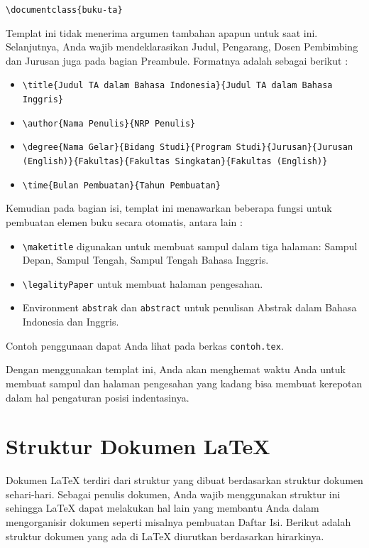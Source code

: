 \documentclass{ta-scientics-matematika-its}
\begin{document}
        \texttt{\textbackslash{}documentclass\{buku-ta\}}

        Templat ini tidak menerima argumen tambahan apapun untuk saat ini. Selanjutnya, Anda wajib mendeklarasikan Judul, Pengarang, Dosen Pembimbing dan Jurusan juga pada bagian Preambule. Formatnya adalah sebagai berikut :

        \begin{itemize}
        	\item \texttt{\textbackslash{}title\{Judul TA dalam Bahasa Indonesia\}\{Judul TA dalam Bahasa Inggris\}}
        	\item \texttt{\textbackslash{}author\{Nama Penulis\}\{NRP Penulis\}}
        	\item \texttt{\textbackslash{}degree\{Nama Gelar\}\{Bidang Studi\}\{Program Studi\}\{Jurusan\}\{Jurusan (English)\}\{Fakultas\}\{Fakultas Singkatan\}\{Fakultas (English)\}}
        	\item \texttt{\textbackslash{}time\{Bulan Pembuatan\}\{Tahun Pembuatan\}}
        \end{itemize}

        Kemudian pada bagian isi, templat ini menawarkan beberapa fungsi untuk pembuatan elemen buku secara otomatis, antara lain :

        \begin{itemize}
        	\item \texttt{\textbackslash{}maketitle} digunakan untuk membuat sampul dalam tiga halaman: Sampul Depan, Sampul Tengah, Sampul Tengah Bahasa Inggris.
        	\item \texttt{\textbackslash{}legalityPaper} untuk membuat halaman pengesahan.
        	\item Environment \texttt{abstrak} dan \texttt{abstract} untuk penulisan Abstrak dalam Bahasa Indonesia dan Inggris.
        \end{itemize}

        Contoh penggunaan dapat Anda lihat pada berkas \texttt{contoh.tex}.

        Dengan menggunakan templat ini, Anda akan menghemat waktu Anda untuk membuat sampul dan halaman pengesahan yang kadang bisa membuat kerepotan dalam hal pengaturan posisi indentasinya.

        \section{Struktur Dokumen \LaTeX{}}
        Dokumen \LaTeX{} terdiri dari struktur yang dibuat berdasarkan struktur dokumen sehari-hari. Sebagai penulis dokumen, Anda wajib menggunakan struktur ini sehingga \LaTeX{} dapat melakukan hal lain yang membantu Anda dalam mengorganisir dokumen seperti misalnya pembuatan Daftar Isi. Berikut adalah struktur dokumen yang ada di \LaTeX{} diurutkan berdasarkan hirarkinya.
\end{document}
